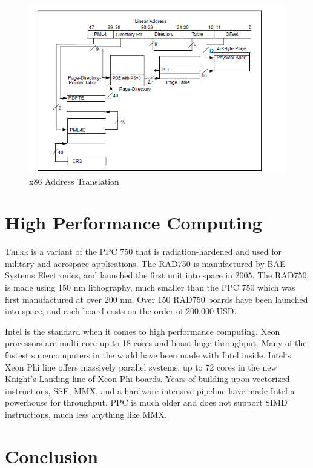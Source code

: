 \documentclass[10pt]{article}
\begin{document}
\par
\begin{figure}[h]
   \centering
   \includegraphics[scale=0.5]{IA_paging}
   \caption{x86 Address Translation}
\end{figure}
\par

\section{High Performance Computing}

\textsc{There} is a variant of the PPC 750 that is radiation-hardened and used for military and aerospace applications. The RAD750 is manufactured by BAE Systems Electronics, and launched the first unit into space in 2005. The RAD750 is made using 150 nm lithography, much smaller than the PPC 750 which was first manufactured at over 200 nm. Over 150 RAD750 boards have been launched into space, and each board costs on the order of 200,000 USD. 
\par
Intel is the standard when it comes to high performance computing. Xeon processors are multi-core up to 18 cores and boast huge throughput. Many of the fastest supercomputers in the world have been made with Intel inside. Intel`s Xeon Phi line offers massively parallel systems, up to 72 cores in the new Knight’s Landing line of Xeon Phi boards. Years of building upon vectorized instructions, SSE, MMX, and a hardware intensive pipeline have made Intel a powerhouse for throughput. PPC is much older and does not support SIMD instructions, much less anything like MMX. 
\par

\section{Conclusion}
\end{document}
